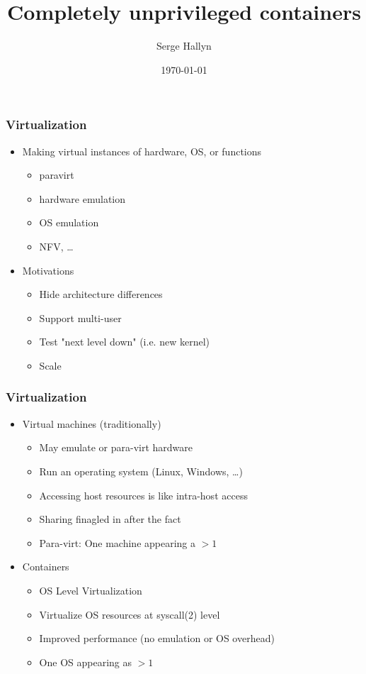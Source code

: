 \documentclass{beamer}
\title[Unprivileged containers]{Completely unprivileged containers} %
\author{Serge Hallyn} %
\institute{LXC project}
\date{\today} %
\begin{document}
\begin{frame}
\titlepage %
\end{frame}

\begin{frame}[fragile]
\frametitle{Virtualization}
	\begin{itemize}
	\item Making virtual instances of hardware, OS, or functions
		\begin{itemize}
		\item paravirt
		\item hardware emulation
		\item OS emulation
		\item NFV, \ldots
		\end{itemize}
\pause
	\item Motivations
		\begin{itemize}
		\item Hide architecture differences
		\item Support multi-user
		\item Test "next level down" (i.e. new kernel)
		\item Scale
		\end{itemize}
	\end{itemize}
\end{frame}

\begin{frame}[fragile]
\frametitle{Virtualization}
	\begin{itemize}
	\item Virtual machines (traditionally)
		\begin{itemize}
		\item May emulate or para-virt hardware
		\item Run an operating system (Linux, Windows, \ldots)
		\item Accessing host resources is like intra-host access
		\item Sharing finagled in after the fact
		\item Para-virt: One machine appearing a $> 1$
		\end{itemize}
\pause
	\item Containers
		\begin{itemize}
		\item OS Level Virtualization
		\item Virtualize OS resources at syscall(2) level
		\item Improved performance (no emulation or OS overhead)
		\item One OS appearing as $> 1$
		\end{itemize}
	\end{itemize}
\end{frame}
\end{document}
